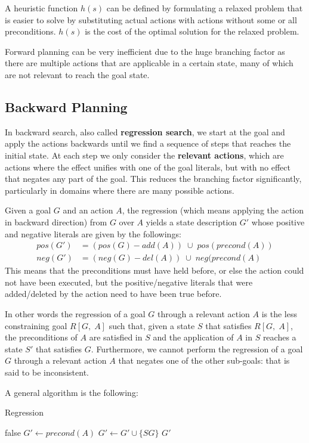 \documentclass{article}
\begin{document}
A heuristic function $h(s)$ can be defined by formulating a relaxed problem that is easier to solve by substituting actual actions with actions without some or all preconditions. $h(s)$ is the cost of the optimal solution for the relaxed problem.

Forward planning can be very inefficient due to the huge branching factor as there are multiple actions that are applicable in a certain state, many of which are not relevant to reach the goal state.

\subsection{Backward Planning}
In backward search, also called \textbf{regression search}, we start at the goal and apply the actions backwards until we find a sequence of steps that reaches the initial state. At each step we only consider the \textbf{relevant actions}, which are actions where the effect unifies with one of the goal literals, but with no effect that negates any part of the goal. This reduces the branching factor significantly, particularly in domains where there are many possible actions.

Given a goal $G$ and an action $A$, the regression (which means applying the action in backward direction) from $G$ over $A$ yields a state description $G'$ whose positive and negative literals are given by the followings:
\begin{align*}
    pos(G') &= (pos(G) - add(A))\;\cup\; pos(precond(A)) \\
    neg(G') &= (neg(G) - del(A))\;\cup\;neg(precond(A)
\end{align*}
This means that the preconditions must have held before, or else the action could not have been executed, but the positive/negative literals that were added/deleted by the action need to have been true before. 

In other words the regression of a goal $G$ through a relevant action $A$ is the less constraining goal $R[G,\;A]$ such that, given a state $S$ that satisfies $R[G,\;A]$, the preconditions of $A$ are satisfied in $S$ and the application of $A$ in $S$ reaches a state $S'$ that satisfies $G$. Furthermore, we cannot perform the regression of a goal $G$ through a relevant action $A$ that negates one of the other sub-goals: that is said to be inconsistent.

A general algorithm is the following:
\begin{algorithm}
    \caption{Regression}
    \begin{algorithmic}[1]
            \State \Return false
        \EndIf
        \State $G' \gets precond(A)$
                \State $G' \gets G' \cup \{SG\}$
            \EndIf
        \EndFor
        \State \Return $G'$
    \EndFunction
    \end{algorithmic}
\end{algorithm}
\end{document}
